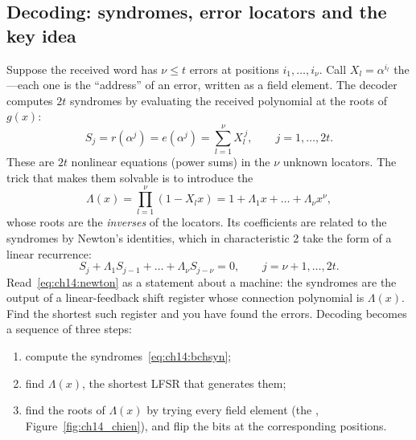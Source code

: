 \subsection{Decoding: syndromes, error locators and the key idea}

Suppose the received word has $\nu\le t$ errors at positions $i_1,\dots,i_\nu$. Call
$X_l=\alpha^{i_l}$ the ---each one is the ``address'' of an error, written as a
field element. The decoder computes $2t$ syndromes by evaluating the received polynomial at the roots
of $g(x)$:
\begin{equation}
S_j=r(\alpha^j)=e(\alpha^j)=\sum_{l=1}^{\nu}X_l^{\,j},\qquad j=1,\dots,2t .
\label{eq:ch14:bchsyn}
\end{equation}
These are $2t$ nonlinear equations (power sums) in the $\nu$ unknown locators. The trick that
makes them solvable is to introduce the 
\begin{equation}
\Lambda(x)=\prod_{l=1}^{\nu}(1-X_lx)=1+\Lambda_1x+\dots+\Lambda_\nu x^\nu,
\label{eq:ch14:locator}
\end{equation}
whose roots are the \emph{inverses} of the locators. Its coefficients are related to the syndromes
by Newton's identities, which in characteristic 2 take the form of a linear recurrence:
\begin{equation}
S_j+\Lambda_1S_{j-1}+\dots+\Lambda_\nu S_{j-\nu}=0,\qquad j=\nu+1,\dots,2t .
\label{eq:ch14:newton}
\end{equation}
Read~\eqref{eq:ch14:newton} as a statement about a machine: the syndromes are the output of a
linear-feedback shift register whose connection polynomial is $\Lambda(x)$. Find the shortest such
register and you have found the errors. Decoding becomes a sequence of three steps:
\begin{enumerate}
\item compute the syndromes~\eqref{eq:ch14:bchsyn};
\item find $\Lambda(x)$, the shortest LFSR that generates them;
\item find the roots of $\Lambda(x)$ by trying every field element (the ,
Figure~\ref{fig:ch14_chien}), and flip the bits at the corresponding positions.
\end{enumerate}
